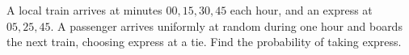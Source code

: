 A local train arrives at minutes $ 00,15,30,45 $ each hour, and an express at $ 05,25,45 $. A passenger arrives uniformly at random during one hour and boards the next train, choosing express at a tie. Find the probability of taking express.
